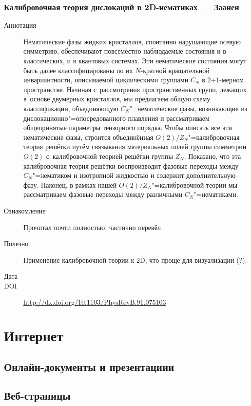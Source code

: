 \documentclass[a4paper, 12pt, titlepage]{extarticle}
\newenvironment{catentry}[2]%
    {\subsubsection{#2}\bibentry{#1}\begin{description}}%
    {\end{description}}
\newcommand{\itabstract}[1]{\item[Аннотация] {\footnotesize #1} }
\newcommand{\itacquaint}[1]{\item[Ознакомление] #1}
\newcommand{\ituseful}[1]{\item[Полезно] #1}
\newcommand{\itdate}[3]{\item[Дата] \formatdate{#1}{#2}{#3}}
\newcommand{\itdoi}[1]{\item[DOI] \url{http://dx.doi.org/#1}}
\begin{document}
  \begin{catentry}{liu-nematic}{Калибровочная теория дислокаций в 2D-нематиках~--- Заанен}
    \itabstract{
      Нематические фазы жидких кристаллов, спонтанно нарушающие осевую симметрию, обеспечивают
      повсеместно наблюдаемые состояния и в классических, и в квантовых системах. Эти нематические
      состояния могут быть далее классифицированы по их $N$-кратной вращательной инвариантности,
      описываемой циклическими группами $C_N$ в 2+1-мерном пространстве. Начиная с~рассмотрения
      пространственных групп, лежащих в~основе двумерных кристаллов, мы предлагаем общую схему
      классификации, объединяющую $C_N$"=нематические фазы, возникающие из дислокационно"=опосредованного
      плавления и рассматриваем общепринятые параметры тензорного порядка. Чтобы описать все эти
      нематические фазы, строится объединённая $O(2)/Z_N$"=калибровочная теория решётки путём
      связывания материальных полей группы симметрии $O(2)$ с~калибровочной теорией решётки группы
      $Z_N$. Показано, что эта калибровочная теория решётки воспроизводит фазовые переходы между
      $C_N$"=нематиком и изотропной жидкостью и содержит дополнительную \todo{deconfined} фазу.
      Наконец, в рамках нашей $O(2)/Z_N$"=калибровочной теории мы рассматриваем фазовые переходы
      между различными $C_N$"=нематиками.
    }
    \itacquaint{
      Прочитал почти полностью, частично перевёл
    }
    \ituseful{
      Применение калибровочной теории к 2D, что проще для визуализации (?).
    }
    \itdate{6}{5}{2015}
    \itdoi{10.1103/PhysRevB.91.075103}
  \end{catentry}


  \section{Интернет}

  \subsection{Онлайн-документы и презентациии}



  \subsection{Веб-страницы}

  \PrintBibliography
\end{document}
